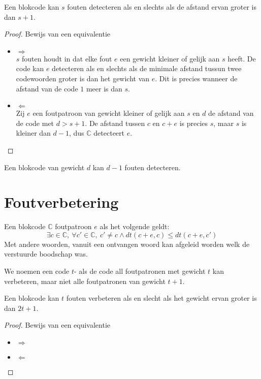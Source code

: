 \documentclass[main.tex]{subfiles}
\begin{document}
\begin{st}
  Een blokcode kan $s$ fouten detecteren als en slechts als de afstand ervan groter is dan $s+1$.
  
  \begin{proof}
    Bewijs van een equivalentie
    \begin{itemize}
    \item $\Rightarrow$\\
      $s$ fouten houdt in dat elke fout $e$ een gewicht kleiner of gelijk aan $s$ heeft.
      De code kan $e$ detecteren als en slechts als de minimale afstand tussun twee codewoorden groter is dan het gewicht van $e$.
      Dit is precies wanneer de afstand van de code $1$ meer is dan $s$.
    \item $\Leftarrow$\\
      Zij $e$ een foutpatroon van gewicht kleiner of gelijk aan $s$ en $d$ de afstand van de code met $d> s+1$.
      De afstand tussen $c$ en $c+e$ is precies $s$, maar $s$ is kleiner dan $d-1$, dus $\mathbb{C}$ detecteert $e$.
    \end{itemize}
  \end{proof}
\end{st}

\begin{gev}
  Een blokcode van gewicht $d$ kan $d-1$ fouten detecteren.
\end{gev}

\section{Foutverbetering}

\begin{de}
  Een blokcode $\mathbb{C}$  foutpatroon $e$ als het volgende geldt:
  \[ \exists c \in \mathbb{C},\ \forall c' \in \mathbb{C},\ c' \neq c \wedge dt(c+e,c) \le dt(c+e,c') \]
  Met andere woorden, vanuit een ontvangen woord kan afgeleid worden welk de verstuurde boodschap was.
\end{de}

\begin{de}
  We noemen een code $t$- als de code all foutpatronen met gewicht $t$ kan verbeteren, maar niet alle foutpatronen van gewicht $t+1$.
\end{de}

\begin{st}
  Een blokcode kan $t$ fouten verbeteren als en slecht als het gewicht ervan groter is dan $2t+1$.

  \begin{proof}
    Bewijs van een equivalentie
    \begin{itemize}
    \item $\Rightarrow$\\
    \item $\Leftarrow$\\
    \end{itemize}
  \end{proof}
\end{st}
\end{document}
